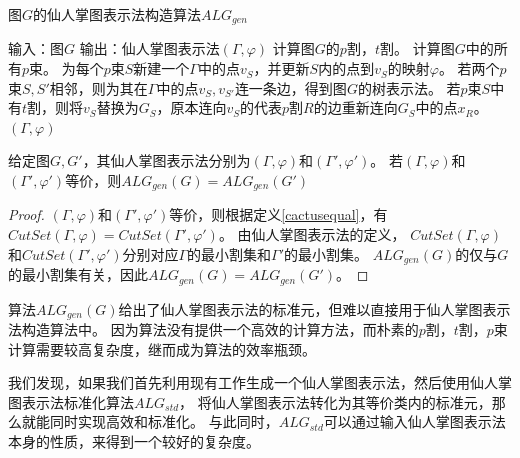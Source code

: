 \begin{algorithm}
  \caption{图$G$的仙人掌图表示法构造算法$ALG_{gen}$}
  \label{alg:gen}
  \begin{algorithmic}[1] %
  \Statex 输入：图$G$
  \Statex 输出：仙人掌图表示法$(\Gamma,\varphi)$
  \State 计算图$G$的$p$割，$t$割。
  \State 计算图$G$中的所有$p$束。
  \State 为每个$p$束$S$新建一个$\Gamma$中的点$v_S$，并更新$S$内的点到$v_S$的映射$\varphi$。
  \State 若两个$p$束$S,S'$相邻，则为其在$\Gamma$中的点$v_S,v_{S'}$连一条边，得到图$G$的树表示法。
  \State 若$p$束$S$中有$t$割，则将$v_S$替换为$G_S$，原本连向$v_S$的代表$p$割$R$的边重新连向$G_S$中的点$x_R$。
  \State \Return $(\Gamma,\varphi)$
  \end{algorithmic}
\end{algorithm}

\begin{theorem}
  给定图$G,G'$，其仙人掌图表示法分别为$(\Gamma,\varphi)$和$(\Gamma',\varphi')$。
  若$(\Gamma,\varphi)$和$(\Gamma',\varphi')$等价，则$ALG_{gen}(G)=ALG_{gen}(G')$
\end{theorem}

\begin{proof}
  $(\Gamma,\varphi)$和$(\Gamma',\varphi')$等价，则根据定义\ref{cactusequal}，有 $CutSet(\Gamma,\varphi)=CutSet(\Gamma',\varphi')$。
  由仙人掌图表示法的定义，
  $CutSet(\Gamma,\varphi)$和$CutSet(\Gamma',\varphi')$分别对应$\Gamma$的最小割集和$\Gamma'$的最小割集。
  $ALG_{gen}(G)$的仅与$G$的最小割集有关，因此$ALG_{gen}(G)=ALG_{gen}(G')$。

\end{proof}

算法$ALG_{gen}(G)$给出了仙人掌图表示法的标准元，但难以直接用于仙人掌图表示法构造算法中。
因为算法没有提供一个高效的计算方法，而朴素的$p$割，$t$割，$p$束计算需要较高复杂度，继而成为算法的效率瓶颈。

我们发现，如果我们首先利用现有工作生成一个仙人掌图表示法，然后使用仙人掌图表示法标准化算法$ALG_{std}$，
将仙人掌图表示法转化为其等价类内的标准元，那么就能同时实现高效和标准化。
与此同时，$ALG_{std}$可以通过输入仙人掌图表示法本身的性质，来得到一个较好的复杂度。


